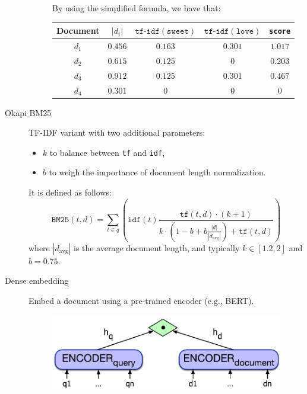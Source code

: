 \begin{description}
\begin{description}
\begin{example}
                    By using the simplified formula, we have that:
                    \begin{table}[H]
                        \centering
                        \footnotesize
                        \begin{tabular}{ccccc}
                            \toprule
                            \textbf{Document} & $|d_i|$ & $\texttt{tf-idf}(\texttt{sweet})$ & $\texttt{tf-idf}(\texttt{love})$ & \texttt{score} \\
                            \midrule
                            $d_1$ & $0.456$ & $0.163$ & $0.301$ & $1.017$ \\
                            $d_2$ & $0.615$ & $0.125$ & $0$ & $0.203$ \\
                            $d_3$ & $0.912$ & $0.125$ & $0.301$ & $0.467$ \\
                            $d_4$ & $0.301$ & $0$ & $0$ & $0$ \\
                            \bottomrule
                        \end{tabular}
                    \end{table}
                \end{example}
        \end{description}


    \item[Okapi BM25] 
        TF-IDF variant with two additional parameters:
        \begin{itemize}
            \item $k$ to balance between \texttt{tf} and \texttt{idf},
            \item $b$ to weigh the importance of document length normalization.
        \end{itemize} 
        It is defined as follows:
        \[ 
            \texttt{BM25}(t, d) = 
                \sum_{t \in q} \left( \texttt{idf}(t) \frac{\texttt{tf}(t, d) \cdot (k+1)}{k \cdot \left( 1 - b + b \frac{|d|}{|d_\text{avg}|} \right) + \texttt{tf}(t, d)} \right)
        \]
        where $|d_\text{avg}|$ is the average document length, and typically $k \in [1.2, 2]$ and $b = 0.75$.


    \item[Dense embedding] 
        Embed a document using a pre-trained encoder (e.g., BERT).

        \begin{figure}[H]
            \centering
            \includegraphics[width=0.45\linewidth]{./img/_info_retrieval_dense_embedding.pdf}
        \end{figure}


\end{description}
